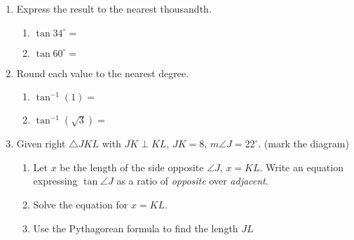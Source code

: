 \begin{enumerate}
\newpage
\item Express the result to the nearest thousandth.  \vspace{.5cm}
  \begin{multicols}{2}
    \begin{enumerate}
      \item $\tan 34^\circ = $ \vspace{1cm}
      \item $\tan 60^\circ =$
    \end{enumerate}
  \end{multicols} \vspace{1cm}

  \item Round each value to the nearest degree.  \vspace{.5cm}
  \begin{multicols}{2}
    \begin{enumerate}
      \item $\tan^{-1} (1) = $ \vspace{1cm}
      \item $\tan^{-1} (\sqrt{3}) =$
    \end{enumerate}
  \end{multicols} \vspace{1cm}

\item Given right $\triangle JKL$ with $\overline{JK} \perp \overline{KL}$, $JK=8$, $m\angle J=22^\circ$. (mark the diagram)
    \begin{enumerate}
      \item Let $x$ be the length of the side opposite $\angle J$, $x=KL$. Write an equation expressing $\tan \angle J$ as a ratio of \emph{opposite} over \emph{adjacent}.  
    \begin{flushright}
      \end{flushright}
      \item Solve the equation for $x=KL$. \vspace{3cm}
      \item Use the Pythagorean formula to find the length $JL$
    \end{enumerate}

\end{enumerate}

